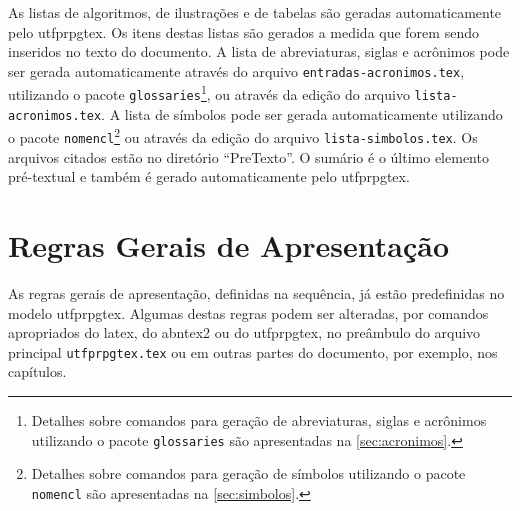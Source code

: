 As listas de algoritmos, de ilustrações e de tabelas são geradas automaticamente pelo \gls{utfprpgtex}. Os itens destas listas são gerados a medida que forem sendo inseridos no texto do documento. A lista de abreviaturas, siglas e acrônimos pode ser gerada automaticamente através do arquivo \texttt{entradas-acronimos.tex}, utilizando o pacote \texttt{glossaries}\footnote{Detalhes sobre comandos para geração de abreviaturas, siglas e acrônimos utilizando o pacote \texttt{glossaries} são apresentadas na \autoref{sec:acronimos}.}, ou através da edição do arquivo \texttt{lista-acronimos.tex}. A lista de símbolos pode ser gerada automaticamente utilizando o pacote \texttt{nomencl}\footnote{Detalhes sobre comandos para geração de símbolos utilizando o pacote \texttt{nomencl} são apresentadas na \autoref{sec:simbolos}.} ou através da edição do arquivo \texttt{lista-simbolos.tex}. Os arquivos citados estão no diretório ``PreTexto''. O sumário é o último elemento pré-textual e também é gerado automaticamente pelo \gls{utfprpgtex}.

\section{Regras Gerais de Apresentação}\label{sec:regrasgerais}

As regras gerais de apresentação, definidas na sequência, já estão predefinidas no modelo \gls{utfprpgtex}. Algumas destas regras podem ser alteradas, por comandos apropriados do \gls{latex}, do \gls{abntex2} ou do \gls{utfprpgtex}, no preâmbulo do arquivo principal \texttt{utfprpgtex.tex} ou em outras partes do documento, por exemplo, nos capítulos.

